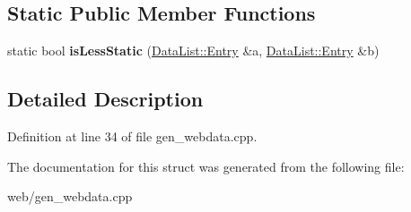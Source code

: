 \subsection*{Static Public Member Functions}
\begin{DoxyCompactItemize}
\item 
\hypertarget{struct_title_sort_a2b7f13d663350b3f8339ae1309163ccb}{static bool {\bfseries is\-Less\-Static} (\hyperlink{struct_data_list_1_1_entry}{Data\-List\-::\-Entry} \&a, \hyperlink{struct_data_list_1_1_entry}{Data\-List\-::\-Entry} \&b)}\label{struct_title_sort_a2b7f13d663350b3f8339ae1309163ccb}

\end{DoxyCompactItemize}


\subsection{Detailed Description}


Definition at line 34 of file gen\-\_\-webdata.\-cpp.



The documentation for this struct was generated from the following file\-:\begin{DoxyCompactItemize}
\item 
web/gen\-\_\-webdata.\-cpp\end{DoxyCompactItemize}
